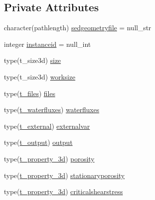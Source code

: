 \subsection*{Private Attributes}
\begin{DoxyCompactItemize}
\item 
character(pathlength) \mbox{\hyperlink{structmoduleconsolidation_1_1t__consolidation_a32cab0eb3370dfb32cb44fa1dee89109}{sedgeometryfile}} = null\+\_\+str
\item 
integer \mbox{\hyperlink{structmoduleconsolidation_1_1t__consolidation_ac8213b82349ce9db913a610802e5566b}{instanceid}} = null\+\_\+int
\item 
type(t\+\_\+size3d) \mbox{\hyperlink{structmoduleconsolidation_1_1t__consolidation_a1522f1827040298495c081711b45999d}{size}}
\item 
type(t\+\_\+size3d) \mbox{\hyperlink{structmoduleconsolidation_1_1t__consolidation_a6b0833498a1e5bc6694266bece2f3dc6}{worksize}}
\item 
type(\mbox{\hyperlink{structmoduleconsolidation_1_1t__files}{t\+\_\+files}}) \mbox{\hyperlink{structmoduleconsolidation_1_1t__consolidation_aef71e5377b25702e3ce4ea6c4abc7f4e}{files}}
\item 
type(\mbox{\hyperlink{structmoduleconsolidation_1_1t__waterfluxes}{t\+\_\+waterfluxes}}) \mbox{\hyperlink{structmoduleconsolidation_1_1t__consolidation_ac1ce152a1fbbd770b1fd8d0c398bf1f1}{waterfluxes}}
\item 
type(\mbox{\hyperlink{structmoduleconsolidation_1_1t__external}{t\+\_\+external}}) \mbox{\hyperlink{structmoduleconsolidation_1_1t__consolidation_ad739d05351acea56d016df15c0bad4c0}{externalvar}}
\item 
type(\mbox{\hyperlink{structmoduleconsolidation_1_1t__output}{t\+\_\+output}}) \mbox{\hyperlink{structmoduleconsolidation_1_1t__consolidation_ad18b7694ec5ce7ec6f50fc25738ebf8a}{output}}
\item 
type(\mbox{\hyperlink{structmoduleconsolidation_1_1t__property__3d}{t\+\_\+property\+\_\+3d}}) \mbox{\hyperlink{structmoduleconsolidation_1_1t__consolidation_a2dd3b109af3922f3e62f141e5077c969}{porosity}}
\item 
type(\mbox{\hyperlink{structmoduleconsolidation_1_1t__property__3d}{t\+\_\+property\+\_\+3d}}) \mbox{\hyperlink{structmoduleconsolidation_1_1t__consolidation_af581d8e17133162ed0cd96006b122e56}{stationaryporosity}}
\item 
type(\mbox{\hyperlink{structmoduleconsolidation_1_1t__property__3d}{t\+\_\+property\+\_\+3d}}) \mbox{\hyperlink{structmoduleconsolidation_1_1t__consolidation_af929cc3c046498111d21c44837bc4124}{criticalshearstress}}

\end{DoxyCompactItemize}
